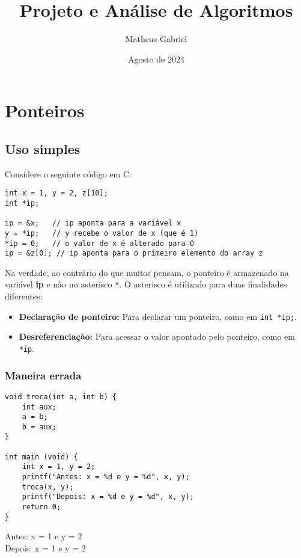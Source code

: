 \documentclass{article}
\title{Projeto e Análise de Algoritmos}
\author{Matheus Gabriel}
\date{Agosto de 2024}
\begin{document}
\maketitle

\section{Ponteiros}

\subsection{Uso simples}

Considere o seguinte código em C:

\begin{verbatim}
int x = 1, y = 2, z[10];
int *ip;

ip = &x;   // ip aponta para a variável x
y = *ip;   // y recebe o valor de x (que é 1)
*ip = 0;   // o valor de x é alterado para 0
ip = &z[0]; // ip aponta para o primeiro elemento do array z
\end{verbatim}

Na verdade, ao contrário do que muitos pensam, o ponteiro é armazenado na variável \textbf{ip} e não no asterisco \texttt{*}. O asterisco é utilizado para duas finalidades diferentes:
\begin{itemize}
    \item \textbf{Declaração de ponteiro:} Para declarar um ponteiro, como em \texttt{int *ip;}.
    \item \textbf{Desreferenciação:} Para acessar o valor apontado pelo ponteiro, como em \texttt{*ip}.
\end{itemize}

\clearpage

\subsubsection{Maneira errada}
\begin{verbatim}
void troca(int a, int b) {
    int aux;
    a = b;
    b = aux;
}

int main (void) {
    int x = 1, y = 2;
    printf("Antes: x = %d e y = %d", x, y);
    troca(x, y);
    printf("Depois: x = %d e y = %d", x, y);
    return 0;
}
\end{verbatim}
Antes: x = 1 e y = 2   \\
Depois: x = 1 e y = 2

\vspace{10pt}
\end{document}
